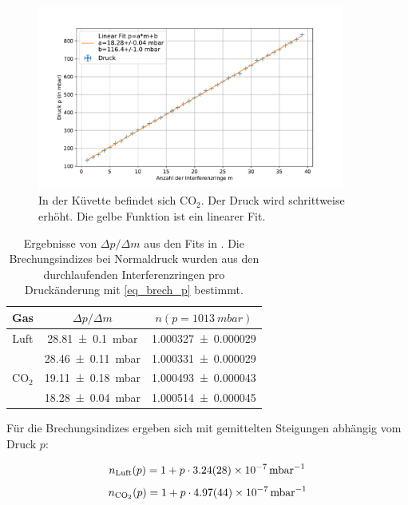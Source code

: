 \documentclass[
	a4paper,
	12pt,
	pagesize,
	ngerman
]{scrartcl}
\begin{document}
\begin{figure}[H]
		\includegraphics[width=0.9\textwidth]{images/CO2_Rein.pdf}
		\centering
		\caption{In der Küvette befindet sich CO$_2$. Der Druck wird schrittweise erhöht. Die gelbe Funktion ist ein linearer Fit.}
		\label{fig_co2_rein}
	\end{figure}



	\begin{table}[H]
		\centering
		\begin{tabular}{| c | c | c |}
			\hline
			  Gas &  $\Delta p/\Delta m$ & $n(p=\SI{1013}{mbar})$\\ \hline
				Luft& \SI{28.81+-0.1}{mbar} & \SI{1.000327+-0.000029}{}\\
				&\SI{28.46+-0.11}{mbar}&\SI{1.000331+-0.000029}{}\\
				CO$_2$ & \SI{19.11+-0.18}{mbar} & \SI{1.000493+-0.000043}{}\\
				&\SI{18.28+-0.04}{mbar}&\SI{1.000514+-0.000045}{}\\
				\hline
		\end{tabular}
		\caption{Ergebnisse von $\Delta p/\Delta m$ aus den Fits in . Die Brechungsindizes bei Normaldruck wurden aus den durchlaufenden Interferenzringen pro Druckänderung mit \cref{eq_brech_p} bestimmt.} %
		\label{tb_gase}
	\end{table}


	Für die Brechungsindizes ergeben sich mit gemittelten Steigungen abhängig vom Druck $p$:

	\begin{equation}
		n_\text{Luft}(p) = 1+p \cdot \SI{3.24+-0.28e-7}{mbar^{-1}}
	\end{equation}
	\begin{equation}
		n_\text{CO$_2$}(p) = 1+ p \cdot \SI{4.97+-0.44e-7}{mbar^{-1}}
	\end{equation}
\end{document}
